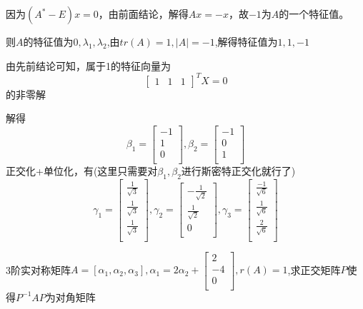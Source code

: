 \documentclass[lang=cn,10pt]{elegantbook}
\begin{document}
\begin{solution}
	
	因为$(A^{*}-E)x=0$，由前面结论，解得$Ax=-x$，故$-1$为$A$的一个特征值。
	
	则$A$的特征值为$0,\lambda_{1},\lambda_{2}$,由$tr(A)=1,|A|=-1$,解得特征值为$1,1,-1$
	
	由先前结论可知，属于1的特征向量为
	\begin{equation*}
		\begin{bmatrix}
			1& 1 &1
		\end{bmatrix}^{T}X=0
	\end{equation*}
	的非零解
	
	解得
	\begin{equation*}
		\beta_{1}=\left[ \begin{array}{c}
			-1\\
			1\\
			0\\
		\end{array} \right],
		\beta_{2}=\left[ \begin{array}{c}
			-1\\
			0\\
			1\\
		\end{array} \right]
	\end{equation*}
	正交化+单位化，有(这里只需要对$\beta_{1},\beta_{2}$进行斯密特正交化就行了)
	\begin{equation*}
		\gamma_{1}=\left[ \begin{array}{c}
			\frac{1}{\sqrt{3}}\\
			\frac{1}{\sqrt{3}}\\
			\frac{1}{\sqrt{3}}\\
		\end{array} \right],
		\gamma_{2}=\left[ \begin{array}{c}
			-\frac{1}{\sqrt{2}}\\
			\frac{1}{\sqrt{2}}\\
			0\\
		\end{array} \right],
		\gamma_{3}=\left[ \begin{array}{c}
			\frac{-1}{\sqrt{6}}\\
			\frac{1}{\sqrt{6}}\\
			\frac{2}{\sqrt{6}}\\
		\end{array} \right]
	\end{equation*}
\end{solution}
\begin{example}
	3阶实对称矩阵$A=[\alpha_{1},\alpha_{2},\alpha_{3}],\alpha _1=2\alpha _2+\left[ \begin{array}{c}
		2\\
		-4\\
		0\\
	\end{array} \right] ,r\left( A \right) =1$,求正交矩阵$P$使得$P^{-1}AP$为对角矩阵
\end{example}
\end{document}
